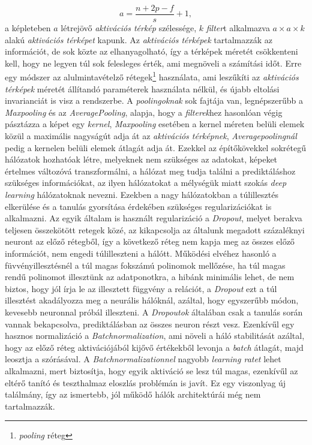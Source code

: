 \documentclass[12pt,letterpaper,oneside,openright]{book}
\begin{document}
\begin{equation}
a = \frac{n+2p-f}{s} +1,
\end{equation}
a képleteben $a$ létrejövő \textit{aktivációs térkép} szélessége, $k$ \textit{filter}t alkalmazva $a\times a\times k$ alakú \textit{aktivációs térképet} kapunk. Az \textit{aktivációs térképek} tartalmazzák az információt, de sok közte az elhanyagolható, így a térképek méretét csökkenteni kell, hogy ne legyen túl sok felesleges érték, ami megnöveli a számítási időt. Erre egy módszer az alulmintavételző rétegek\footnote{\textit{pooling} réteg} használata, ami leszűkíti az \textit{aktivációs térképek} méretét állítandó paraméterek használata nélkül, és újabb eltolási invarianciát is visz a rendszerbe. A \textit{poolingoknak} sok fajtája van, legnépszerűbb a \textit{Maxpooling} és az \textit{AveragePooling}, alapja, hogy a \textit{filterek}hez hasonlóan végig pásztázza a képet egy \textit{kernel},  \textit{Maxpooling} esetében a kernel méreten belüli elemek közül a maximális nagyságút adja át az \textit{aktivációs térképnek}, \textit{Averagepoolingnál} pedig a kernelen belüli elemek átlagát adja át. 
\newline\indent
Ezekkel az építőkövekkel sokrétegű hálózatok hozhatóak létre, melyeknek nem szükséges az adatokat, képeket értelmes változóvá transzformálni, a hálózat meg tudja találni a prediktáláshoz szükséges információkat, az ilyen hálózatokat a mélységük miatt szokás \textit{deep learning} hálózatoknak nevezni. Ezekben a nagy hálózatokban a túlillesztés elkerülése és a tanulás gyorsítása érdekében szükséges regularizációkat is alkalmazni. Az egyik általam is használt regularizáció a \textit{Dropout}, melyet berakva teljesen összekötött retegek közé, az kikapcsolja az általunk megadott százaléknyi neuront az előző rétegből, így a következő réteg nem kapja meg az összes előző információt, nem engedi túlilleszteni a hálótt. Működési elvéhez hasonló a füvvényillesztésnél a túl magas fokszámú polinomok mellőzése, ha túl magas rendű polinomot illesztünk az adatponotkra, a hibánk minimális lehet, de nem biztos, hogy jól írja le az illesztett függvény a relációt, a \textit{Dropout} ezt a túl illesztést akadályozza meg a neurális hálóknál, azáltal, hogy egyszerűbb módon, kevesebb neuronnal próbál illeszteni. A \textit{Dropoutok} általában csak a tanulás során vannak bekapcsolva, prediktálásban az összes neuron részt vesz. Ezenkívűl egy hasznos normalizáció a \textit{Batchnormalization}, ami növeli a háló stabilitását azáltal, hogy az előző réteg aktivációjából kijővő értékekből levonja a \textit{batch} átlagát, majd leosztja a szórásával. A \textit{Batchnormalizationnel} nagyobb \textit{learning ratet} lehet alkalmazni, mert biztosítja, hogy egyik aktiváció se lesz túl magas, ezenkívűl az eltérő tanító és teszthalmaz eloszlás problémán is javít. Ez egy viszonlyag új találmány, így az ismertebb, jól működő hálók architektúrái még nem tartalmazzák.
\end{document}
